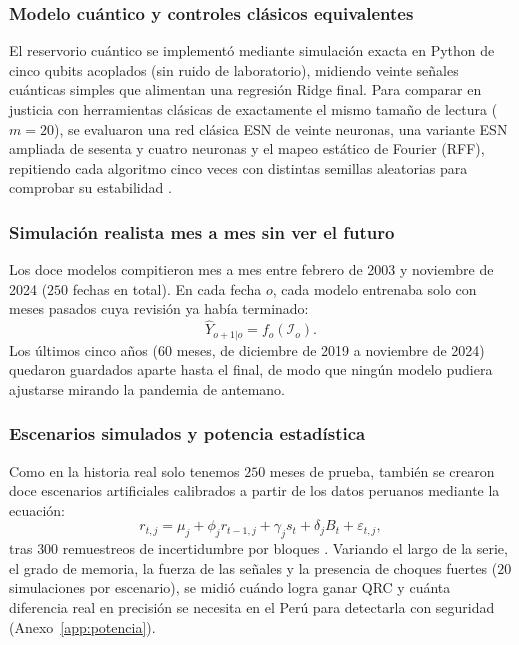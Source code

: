 \subsubsection{Modelo cuántico y controles clásicos equivalentes}

El reservorio cuántico se implementó mediante simulación exacta en Python de cinco qubits acoplados (sin ruido de laboratorio), midiendo veinte señales cuánticas simples que alimentan una regresión Ridge final. Para comparar en justicia con herramientas clásicas de exactamente el mismo tamaño de lectura (\(m=20\)), se evaluaron una red clásica ESN de veinte neuronas, una variante ESN ampliada de sesenta y cuatro neuronas y el mapeo estático de Fourier (RFF), repitiendo cada algoritmo cinco veces con distintas semillas aleatorias para comprobar su estabilidad \parencite{schuld2021}.

\subsubsection{Simulación realista mes a mes sin ver el futuro}

Los doce modelos compitieron mes a mes entre febrero de 2003 y noviembre de 2024 (\(250\) fechas en total). En cada fecha \(o\), cada modelo entrenaba solo con meses pasados cuya revisión ya había terminado:
\[
\widehat{Y}_{o+1|o}=f_o(\mathcal{I}_o).
\]
Los últimos cinco años (\(60\) meses, de diciembre de 2019 a noviembre de 2024) quedaron guardados aparte hasta el final, de modo que ningún modelo pudiera ajustarse mirando la pandemia de antemano.

\subsubsection{Escenarios simulados y potencia estadística}

Como en la historia real solo tenemos \(250\) meses de prueba, también se crearon doce escenarios artificiales calibrados a partir de los datos peruanos mediante la ecuación:
\begin{equation}
	r_{t,j}=\mu_j+\phi_j r_{t-1,j}
	+\gamma_j s_t+\delta_j B_t+\varepsilon_{t,j},
	\label{eq:dgp}
\end{equation}
tras \(300\) remuestreos de incertidumbre por bloques \parencite{politis1992}. Variando el largo de la serie, el grado de memoria, la fuerza de las señales y la presencia de choques fuertes (\(20\) simulaciones por escenario), se midió cuándo logra ganar QRC y cuánta diferencia real en precisión se necesita en el Perú para detectarla con seguridad (Anexo~\ref{app:potencia}).

